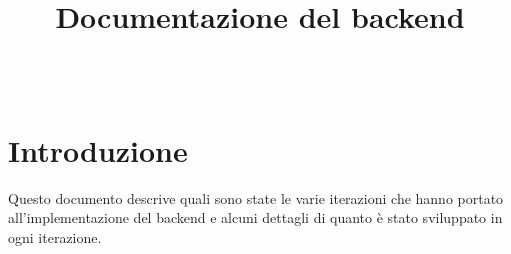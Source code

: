 \documentclass[10pt]{article}
\title{Documentazione del backend\\[2mm]}
\author{\Nome\ \Cognome}
\begin{document}
\maketitle

\tableofcontents

\section{Introduzione}
Questo documento descrive quali sono state le varie iterazioni che hanno portato all'implementazione del backend e alcuni dettagli di quanto \`e stato sviluppato in ogni iterazione.



\printindex
\end{document}
